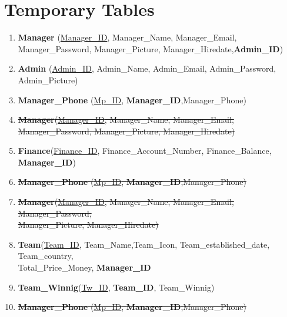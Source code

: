 \section{Temporary Tables}
\hrulefill
\begin{enumerate}
    \item \textbf{Manager} (\underline{Manager\_ID}, Manager\_Name, Manager\_Email, Manager\_Password, Manager\_Picture, Manager\_Hiredate,\textbf{Admin\_ID})
    \item \textbf{Admin} (\underline{Admin\_ID}, Admin\_Name, Admin\_Email, Admin\_Password, Admin\_Picture)
    \item \textbf{Manager\_Phone} (\underline{Mp\_ID}, \textbf{Manager\_ID},{Manager\_Phone})


    \item \sout{\textbf{Manager}(\underline{Manager\_ID}, Manager\_Name, Manager\_Email, Manager\_Password, Manager\_Picture, Manager\_Hiredate)}
    \item \textbf{Finance}(\underline{Finance\_ID}, Finance\_Account\_Number, Finance\_Balance,\textbf{ Manager\_ID})
    \item \sout{\textbf{Manager\_Phone} (\underline{Mp\_ID}, \textbf{Manager\_ID},{Manager\_Phone})}


    \item \sout{\textbf{Manager}(\underline{Manager\_ID}, Manager\_Name, Manager\_Email, Manager\_Password,\\Manager\_Picture, Manager\_Hiredate)}
    \item \textbf{Team}(\underline{Team\_ID}, Team\_Name,Team\_Icon, Team\_established\_date, Team\_country,\\Total\_Price\_Money, \textbf{Manager\_ID}
    \item \textbf{Team\_Winnig}(\underline{Tw\_ID}, \textbf{Team\_ID}, Team\_Winnig)
    \item \sout{\textbf{Manager\_Phone} (\underline{Mp\_ID}, \textbf{Manager\_ID},{Manager\_Phone})}




\end{enumerate}
